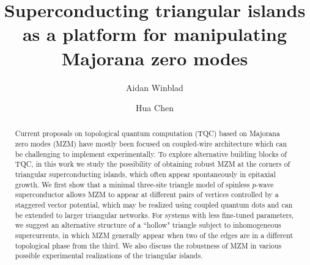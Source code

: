 \documentclass[aps,prb,showpacs,amsmath,twocolumn,amssymb,superscriptaddress]{revtex4-2}
\begin{document}
\title{Superconducting triangular islands as a platform for manipulating Majorana zero modes}

\author{Aidan Winblad}

\author{Hua Chen}

\begin{abstract}
Current proposals on topological quantum computation (TQC) based on Majorana zero modes (MZM) have mostly been focused on coupled-wire architecture which can be challenging to implement experimentally. To explore alternative building blocks of TQC, in this work we study the possibility of obtaining robust MZM at the corners of triangular superconducting islands, which often appear spontaneously in epitaxial growth. We first show that a minimal three-site triangle model of spinless $p$-wave superconductor allows MZM to appear at different pairs of vertices controlled by a staggered vector potential, which may be realized using coupled quantum dots and can be extended to larger triangular networks. For systems with less fine-tuned parameters, we suggest an alternative structure of a ``hollow" triangle subject to inhomogeneous supercurrents, in which MZM generally appear when two of the edges are in a different topological phase from the third. We also discuss the robustness of MZM in various possible experimental realizations of the triangular islands.
\end{abstract}


\maketitle
\end{document}
